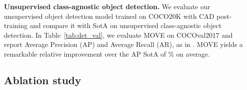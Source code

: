 \documentclass{article}
\newcommand\methodname{MOVE\xspace}
\begin{document}
\textbf{Unsupervised class-agnostic object detection.} We evaluate our unsupervised object detection model trained on COCO20K with CAD post-training and compare it with SotA on unsupervised class-agnostic object detection. In Table~\ref{tab:det_val}, we evaluate \methodname on COCOval2017 and report Average Precision (AP) and Average Recall (AR), as in \cite{wang2022freesolo}. \methodname yields a remarkable relative improvement over the AP SotA of \% on average.







    
    





\subsection{Ablation study}
\label{sec:ablation}
\end{document}
